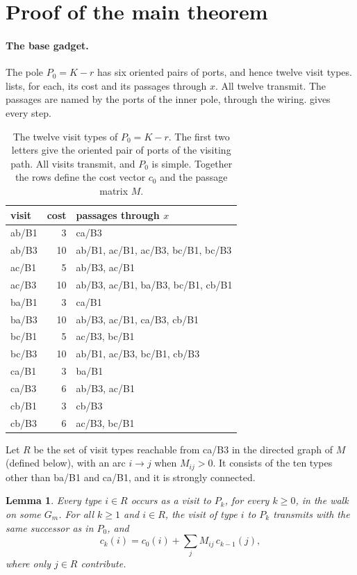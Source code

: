 \documentclass[11pt]{article}
\newtheorem{lemma}[theorem]{Lemma}
\theoremstyle{definition}
\begin{document}
\section{Proof of the main theorem}\label{sec:proof}

\paragraph{The base gadget.} The pole $P_0 = K - r$ has six oriented pairs of ports, and hence
twelve visit types.  lists, for each, its cost and its passages through $x$. All
twelve transmit. The passages are named by the ports of the inner pole, through the wiring.
 gives every step.

\begin{table}[t]
\centering\small
\begin{tabular}{lrl}
\toprule
visit & cost & passages through $x$ \\
\midrule
ab/B1 & 3 & ca/B3 \\
ab/B3 & 10 & ab/B1, ac/B1, ac/B3, bc/B1, bc/B3 \\
ac/B1 & 5 & ab/B3, ac/B1 \\
ac/B3 & 10 & ab/B3, ac/B1, ba/B3, bc/B1, cb/B1 \\
ba/B1 & 3 & ca/B1 \\
ba/B3 & 10 & ab/B3, ac/B1, ca/B3, cb/B1 \\
bc/B1 & 5 & ac/B3, bc/B1 \\
bc/B3 & 10 & ab/B1, ac/B3, bc/B1, cb/B3 \\
ca/B1 & 3 & ba/B1 \\
ca/B3 & 6 & ab/B3, ac/B1 \\
cb/B1 & 3 & cb/B3 \\
cb/B3 & 6 & ac/B3, bc/B1 \\
\bottomrule
\end{tabular}
\caption{The twelve visit types of $P_0 = K - r$. The first two letters give the oriented pair of
ports of the visiting path. All visits transmit, and $P_0$ is simple. Together the rows define the
cost vector $c_0$ and the passage matrix $M$.}
\label{tab:P0}
\end{table}

Let $R$ be the set of visit types reachable from ca/B3 in the directed graph of $M$ (defined
below), with an arc $i \to j$ when $M_{ij} > 0$. It consists of the ten types other than ba/B1 and
ca/B1, and it is strongly connected.

\begin{lemma}\label{lem:recursion}
Every type $i \in R$ occurs as a visit to $P_k$, for every $k \ge 0$, in the walk on some $G_m$.
For all $k \ge 1$ and $i \in R$, the visit of type $i$ to $P_k$ transmits with the same successor
as in $P_0$, and
\[
c_k(i) = c_0(i) + \sum_{j} M_{ij}\, c_{k-1}(j),
\]
where only $j \in R$ contribute.
\end{lemma}
\end{document}
